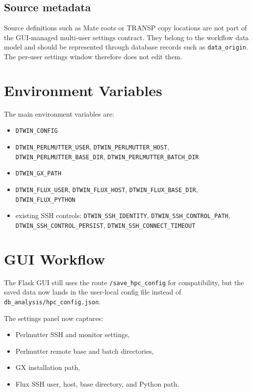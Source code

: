 \documentclass[11pt]{article}
\newcommand{\code}[1]{\texttt{#1}}
\begin{document}
\subsection{Source metadata}

Source definitions such as Mate roots or TRANSP copy locations are not part of
the GUI-managed multi-user settings contract. They belong to the workflow data
model and should be represented through database records such as
\code{data\_origin}. The per-user settings window therefore does not edit them.

\section{Environment Variables}

The main environment variables are:

\begin{itemize}
\item \code{DTWIN\_CONFIG}
\item \code{DTWIN\_PERLMUTTER\_USER}, \code{DTWIN\_PERLMUTTER\_HOST},
\code{DTWIN\_PERLMUTTER\_BASE\_DIR}, \code{DTWIN\_PERLMUTTER\_BATCH\_DIR}
\item \code{DTWIN\_GX\_PATH}
\item \code{DTWIN\_FLUX\_USER}, \code{DTWIN\_FLUX\_HOST},
\code{DTWIN\_FLUX\_BASE\_DIR}, \code{DTWIN\_FLUX\_PYTHON}
\item existing SSH controls:
\code{DTWIN\_SSH\_IDENTITY}, \code{DTWIN\_SSH\_CONTROL\_PATH},
\code{DTWIN\_SSH\_CONTROL\_PERSIST}, \code{DTWIN\_SSH\_CONNECT\_TIMEOUT}
\end{itemize}

\section{GUI Workflow}

The Flask GUI still uses the route \code{/save\_hpc\_config} for compatibility,
but the saved data now lands in the user-local config file instead of
\code{db\_analysis/hpc\_config.json}.

The settings panel now captures:

\begin{itemize}
\item Perlmutter SSH and monitor settings,
\item Perlmutter remote base and batch directories,
\item GX installation path,
\item Flux SSH user, host, base directory, and Python path.
\end{itemize}
\end{document}
